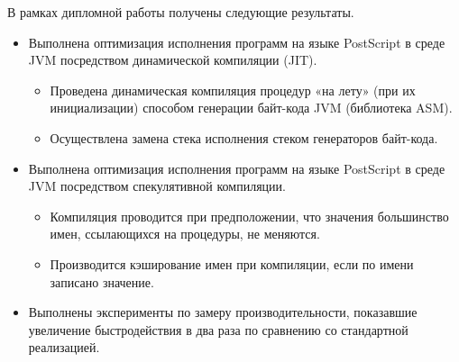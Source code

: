 	В рамках дипломной работы получены следующие результаты.
	\begin{itemize}
		\item Выполнена оптимизация исполнения программ на языке PostScript в среде JVM посредством динамической компиляции (JIT).
		\begin{itemize}
			\item Проведена динамическая компиляция процедур «на лету» (при их инициализации) способом генерации байт-кода JVM (библиотека ASM).
			\item Осуществлена замена стека исполнения стеком генераторов байт-кода.
		\end{itemize}
		\item Выполнена оптимизация исполнения программ на языке PostScript в среде JVM посредством спекулятивной компиляции.
		\begin{itemize}
			\item Компиляция проводится при предположении, что значения большинство имен, ссылающихся на процедуры, не меняются.
			\item Производится кэширование имен при компиляции, если по имени записано значение.
		\end{itemize}
		\item  Выполнены эксперименты по замеру производительности, показавшие увеличение быстродействия в два раза по сравнению со стандартной реализацией. 
	\end{itemize}
	
